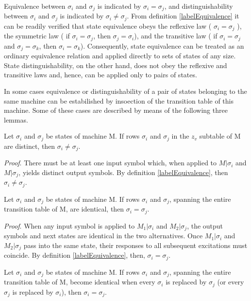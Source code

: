 \documentclass[a4paper]{report}
\begin{document}
    Equivalence between $\sigma_i$ and $\sigma_j$ is indicated by $\sigma_i = \sigma_j$, and distinguishability between $\sigma_i$ and $\sigma_j$ is indicated by  $\sigma_i \neq \sigma_j$. From definition \ref{labelEquivalence} it can be readily verified that state equivalence obeys the reflexive law ( $\sigma_i = \sigma_j$ ), the symmetric law ( if $\sigma_i = \sigma_j$, then $\sigma_j = \sigma_i$), and the transitive law  ( if $\sigma_i = \sigma_j$ and  $\sigma_j = \sigma_k$, then $\sigma_i = \sigma_k$). Consequently, state equivalence can be treated as an ordinary equivalence relation and applied directly to sets of states of any size. State distinguishability, on the other hand, does not obey the reflexive and transitive laws and, hence, can be applied only to pairs of states.

    In some cases equivalence or distinguishability of a pair of states belonging to the same machine can be estabilished by insoection of the transition table of this machine. Some of these cases are described by means of the following three lemmas. 


    \lemma \label{labelSimplyDistinct} Let $\sigma_i$ and $\sigma_j$ be states of machine M. If rows $\sigma_i$ and $\sigma_j$ in the $ z_v $ subtable of M are distinct, then $ \sigma_i \neq \sigma_j $.

    \emph{Proof}. There must be at least one input symbol which, when applied to $M|\sigma_i$ and $M|\sigma_j$, yields distinct output symbols. By definition \ref{labelEquivalence}, then $\sigma_i \neq \sigma_j$.


    \lemma \label{labelSimplyEquiv} Let $\sigma_i$ and $\sigma_j$ be states of machine M. If rows $\sigma_i$ and $\sigma_j$, spanning the entire transition table of M, are identical, then $\sigma_i = \sigma_j$.

    \emph{Proof}. When any input symbol is applied to $M_1|\sigma_i$ and $M_2|\sigma_j$, the output symbols and next states are identical in the two alternatives. Once $M_1|\sigma_i$ and $M_2|\sigma_j$ pass into the same state, their responses to all subsequent excitations must coincide. By definition \ref{labelEquivalence}, then, $\sigma_i = \sigma_j$.

    \lemma \label{labelSimplyModifiedEquiv} Let $\sigma_i$ and $\sigma_j$ be states of machine M. If rows $\sigma_i$ and $\sigma_j$, spanning the entire transition table of M, become identical when every $\sigma_i$ is replaced by $\sigma_j$ (or every $\sigma_j$ is replaced by $\sigma_i$), then $\sigma_i = \sigma_j$.
\end{document}
